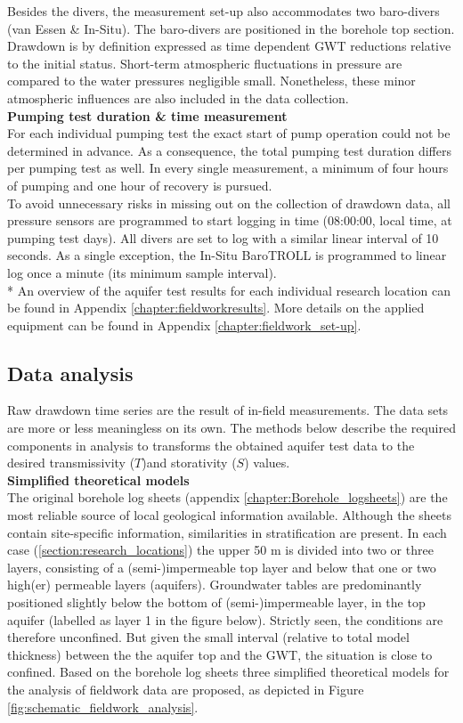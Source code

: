 Besides the divers, the measurement set-up also accommodates two baro-divers (van Essen \& In-Situ). The baro-divers are positioned in the borehole top section. Drawdown is by definition expressed as time dependent GWT reductions relative to the initial status. Short-term atmospheric fluctuations in pressure are compared to the water pressures negligible small. Nonetheless, these minor atmospheric influences are also included in the data collection. 
\bigskip \\
\textbf{Pumping test duration \& time measurement} \\
For each individual pumping test the exact start of pump operation could not be determined in advance. As a consequence, the total pumping test duration differs per pumping test as well. In every single measurement, a minimum of four hours of pumping and one hour of recovery is pursued. \\
To avoid unnecessary risks in missing out on the collection of drawdown data, all pressure sensors are programmed to start logging in time (08:00:00, local time, at pumping test days). All divers are set to log with a similar linear interval of 10 seconds. As a single exception, the In-Situ BaroTROLL is programmed to linear log once a minute (its minimum sample interval). \\

* An overview of the aquifer test results for each individual research location can be found in Appendix \ref{chapter:fieldworkresults}. More details on the applied equipment can be found in Appendix \ref{chapter:fieldwork_set-up}.

\subsection{Data analysis}
\label{subsection:derivation_methods}
Raw drawdown time series are the result of in-field measurements. The data sets are more or less meaningless on its own. The methods below describe the required components in analysis to transforms the obtained aquifer test data to the desired transmissivity ($T$)and storativity ($S$) values. \\

\textbf{Simplified theoretical models} \\
The original borehole log sheets (appendix \ref{chapter:Borehole_logsheets}) are the most reliable source of local geological information available. Although the sheets contain site-specific information, similarities in stratification are present. In each case (\ref{section:research_locations}) the upper 50 m is divided into two or three layers, consisting of a (semi-)impermeable top layer and below that one or two high(er) permeable layers (aquifers). Groundwater tables are predominantly positioned slightly below the bottom of (semi-)impermeable layer, in the top aquifer (labelled as layer 1 in the figure below). Strictly seen, the conditions are therefore unconfined. But given the small interval (relative to total model thickness) between the the aquifer top and the GWT, the situation is close to confined. Based on the borehole log sheets three simplified theoretical models for the analysis of fieldwork data are proposed, as depicted in Figure \ref{fig:schematic_fieldwork_analysis}. 

